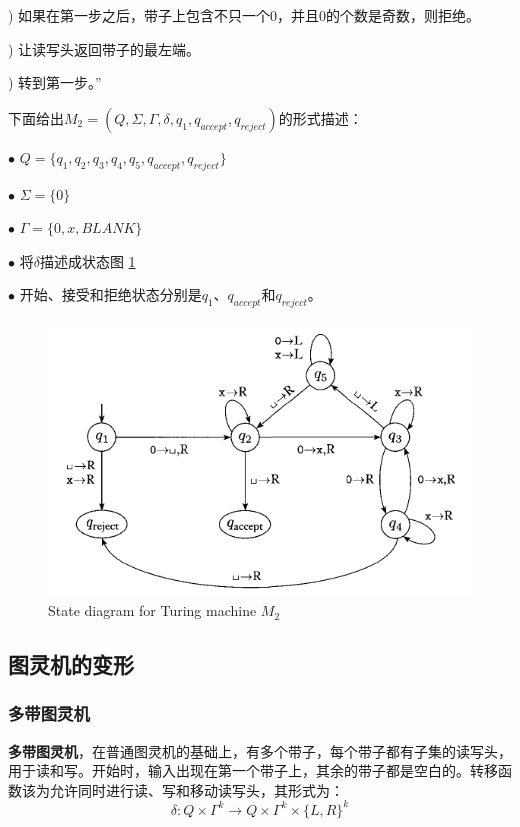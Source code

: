 \documentclass[a4paper]{article}
\begin{document}
	) 如果在第一步之后，带子上包含不只一个$0$，并且$0$的个数是奇数，则拒绝。
	
	) 让读写头返回带子的最左端。
	
	) 转到第一步。”

	下面给出$M_2=(Q, \Sigma, \Gamma, \delta, q_1, q_{accept}, q_{reject})$的形式描述：
	
	\qquad $\bullet$ $Q=\{q_1,q_2,q_3,q_4,q_5,q_{accept},q_{reject}\}$
	
	\qquad $\bullet$ $\Sigma=\{0\}$
	
	\qquad $\bullet$ $\Gamma=\{0,x,BLANK\}$
	
	\qquad $\bullet$ 将$\delta$描述成状态图 \ref{F040102}
	
	\qquad $\bullet$ 开始、接受和拒绝状态分别是$q_1$、$q_{accept}$和$q_{reject}$。
	
	\begin{figure}[htb]
		\centering
		\includegraphics[scale=0.8]{./figure/4.1.2.png}
		\caption{State diagram for Turing machine $M_2$}
		\label{F040102}
	\end{figure}

\subsection{图灵机的变形}

\subsubsection{多带图灵机}

	\textbf{多带图灵机}，在普通图灵机的基础上，有多个带子，每个带子都有子集的读写头，用于读和写。开始时，输入出现在第一个带子上，其余的带子都是空白的。转移函数该为允许同时进行读、写和移动读写头，其形式为：
	$$\delta:Q \times \Gamma^k \rightarrow Q \times \Gamma^k \times \{L,R\}^k$$
\end{document}
